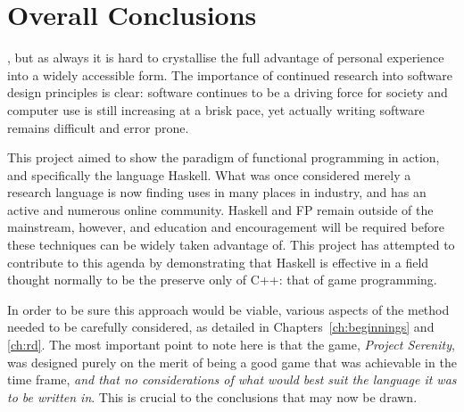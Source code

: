 \chapter[Overall Conclusions]{Overall Conclusions}
\label{ch:conclusions}


, but as always it is hard to crystallise the full advantage of personal experience into a widely accessible form. The importance of continued research into software design principles is clear: software continues to be a driving force for society and computer use is still increasing at a brisk pace,\cite{borodovsky2006marching} yet actually writing software remains difficult and error prone.\cite[1em]{paulk1993capability} 

This project aimed to show the paradigm of functional programming in action, and specifically the language Haskell. What was once considered merely a research language is now finding uses in many places in industry, and has an active and numerous online community. Haskell and FP remain outside of the mainstream, however, and education and encouragement will be required before these techniques can be widely taken advantage of. This project has attempted to contribute to this agenda by demonstrating that Haskell is effective in a field thought normally to be the preserve only of C++: that of game programming. 

In order to be sure this approach would be viable, various aspects of the method needed to be carefully considered, as detailed in Chapters~\ref{ch:beginnings} and \ref{ch:rd}. The most important point to note here is that the game, \emph{Project Serenity}, was designed purely on the merit of being a good game that was achievable in the time frame, \emph{and that no considerations of what would best suit the language it was to be written in}. This is crucial to the conclusions that may now be drawn.

